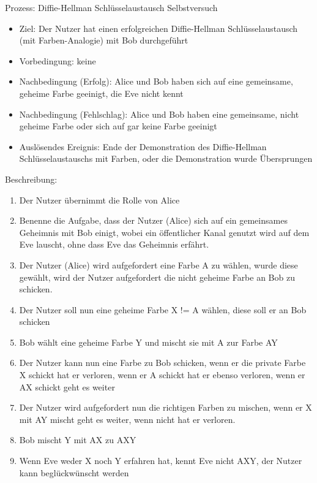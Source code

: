 \documentclass{article}
\begin{document}
\begin{FA}[start=100]
\item Prozess: Diffie-Hellman Schlüsselaustausch Selbstversuch
\end{FA}
\begin{itemize}[label={}]
    \item Ziel: Der Nutzer hat einen erfolgreichen Diffie-Hellman Schlüsselaustausch
        (mit Farben-Analogie) mit Bob durchgeführt
    \item Vorbedingung: keine
    \item Nachbedingung (Erfolg): Alice und Bob haben sich auf eine
        gemeinsame, geheime Farbe geeinigt, die Eve nicht kennt
    \item Nachbedingung (Fehlschlag): Alice und Bob haben eine gemeinsame,
        nicht geheime Farbe oder sich auf gar keine Farbe geeinigt
    \item Auslösendes Ereignis: Ende der Demonstration des Diffie-Hellman
        Schlüsselaustauschs mit Farben, oder die Demonstration wurde Übersprungen
\end{itemize}

Beschreibung:
\begin{enumerate}
    \item Der Nutzer übernimmt die Rolle von Alice
    \item Benenne die Aufgabe, dass der Nutzer (Alice) sich auf ein gemeinsames Geheimnis
        mit Bob einigt, wobei ein öffentlicher Kanal genutzt wird auf dem Eve lauscht,
        ohne dass Eve das Geheimnis erfährt.
    \item Der Nutzer (Alice) wird aufgefordert eine Farbe A zu wählen,
        wurde diese gewählt, wird der Nutzer aufgefordert
        die nicht geheime Farbe an Bob zu schicken.
    \item Der Nutzer soll nun eine geheime Farbe X != A wählen,
        diese soll er an Bob schicken
    \item Bob wählt eine geheime Farbe Y und mischt sie mit A zur Farbe AY
    \item Der Nutzer kann nun eine Farbe zu Bob schicken,
        wenn er die private Farbe X schickt hat er verloren,
        wenn er A schickt hat er ebenso verloren,
        wenn er AX schickt geht es weiter
    \item Der Nutzer wird aufgefordert nun die richtigen Farben zu mischen,
        wenn er X mit AY mischt geht es weiter, wenn nicht hat er verloren.
    \item Bob mischt Y mit AX zu AXY
    \item Wenn Eve weder X noch Y erfahren hat, kennt Eve nicht AXY,
        der Nutzer kann beglückwünscht werden
\end{enumerate}
\end{document}

